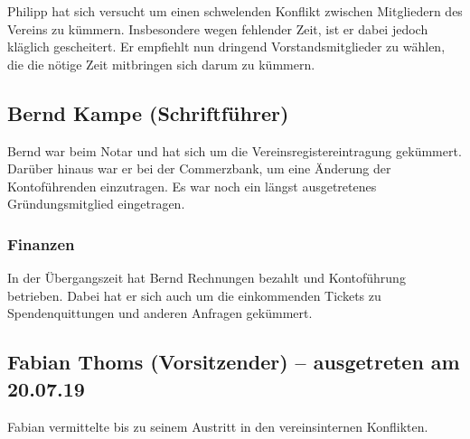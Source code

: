 \documentclass[ngerman]{scrartcl}
\begin{document}
Philipp hat sich versucht um einen schwelenden Konflikt zwischen Mitgliedern
des Vereins zu kümmern. Insbesondere wegen fehlender Zeit, ist er dabei jedoch
kläglich gescheitert. Er empfiehlt nun dringend Vorstandsmitglieder zu wählen, die
die nötige Zeit mitbringen sich darum zu kümmern.

\subsection{Bernd Kampe (Schriftführer)}

Bernd war beim Notar und hat sich um die Vereinsregistereintragung gekümmert. Darüber hinaus war er bei der Commerzbank, um eine Änderung der Kontoführenden einzutragen. Es war noch ein längst ausgetretenes Gründungsmitglied eingetragen.

\subsubsection{Finanzen}

In der Übergangszeit hat Bernd Rechnungen bezahlt und Kontoführung betrieben. Dabei hat er sich auch um die einkommenden Tickets zu Spendenquittungen und anderen Anfragen gekümmert.

\subsection{Fabian Thoms (Vorsitzender) -- ausgetreten am 20.07.19}

Fabian vermittelte bis zu seinem Austritt in den vereinsinternen Konflikten.
\end{document}
